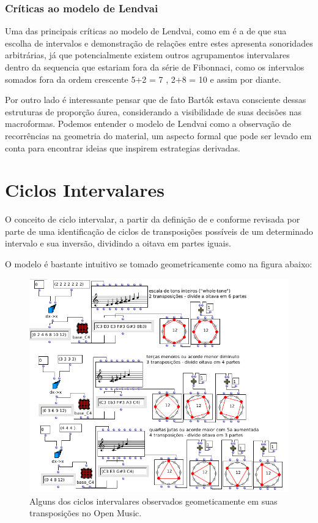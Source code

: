 \documentclass[
	12pt,				%
	openright,			%
	twoside,			%
	a4paper,			%
	english,			%
	french,				%
	spanish,			%
	brazil				%
	]{abntex2}
\begin{document}
\subsubsection{Críticas ao modelo de Lendvai}

Uma das principais críticas ao modelo de Lendvai, como em  é a de que sua escolha de intervalos e demonstração de relações entre estes apresenta sonoridades arbitrárias, já que potencialmente existem outros agrupamentos intervalares dentro da sequencia que estariam fora da série de Fibonnaci, como os intervalos somados fora da ordem crescente 5+2 = 7 , 2+8 = 10 e assim por diante.

Por outro lado é interessante pensar que de fato Bartók estava consciente dessas estruturas de proporção áurea, considerando a visibilidade de suas decisões nas macroformas. Podemos entender o modelo de Lendvai como a observação de recorrências na geometria do material, um aspecto formal que pode ser levado em conta para encontrar ideias que inspirem estrategias derivadas.




\section{Ciclos Intervalares}

O conceito de ciclo intervalar, a partir da definição de  e conforme revisada por \cite[ p.22]{susanni_antokoletz2012music} parte de uma identificação de ciclos de transposições possíveis de um determinado intervalo e sua inversão, dividindo a oitava em partes iguais.

O modelo é bastante intuitivo se tomado geometricamente como na figura abaixo:

\begin{figure}[!h]
	\caption{\label{fig_grafico}Alguns dos ciclos intervalares observados geometicamente em suas transposições no Open Music.  }
	\begin{center}
	    \includegraphics[scale=0.5]{ciclos/ciclosOM.png}
	\end{center}
\end{figure}
\end{document}
